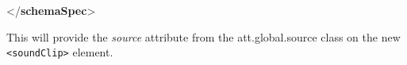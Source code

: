 \begin{shaded}
\hspace*{1em}\mbox{}\newline 
\hspace*{1em}\hspace*{1em}\mbox{}\newline 
\hspace*{1em}\mbox{}\newline 
{}\mbox{}\newline 
{</\textbf{schemaSpec}>}\end{shaded}\egroup\par \noindent  This will provide the {\itshape source} attribute from the \textsf{att.global.source} class on the new \texttt{<soundClip>} element.\par

